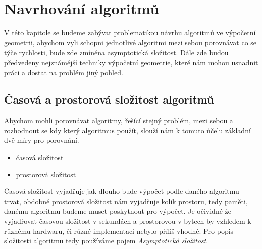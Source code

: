 \chapter{Navrhování algoritmů}
\label{chap:navrhovanialgoritmu}
	V této kapitole se budeme zabývat problematikou návrhu algoritmů ve výpočetní geometrii, abychom vyli schopni jednotlivé algoritmi mezi sebou porovnávat co se týče rychlosti, bude zde zmíněna asymptotická složitost. Dále zde budou předvedeny nejznámější techniky výpočetní geometrie, které nám mohou usnadnit práci a dostat na problém jiný pohled.

\section{Časová a prostorová složitost algoritmů}
	Abychom mohli porovnávat algoritmy, řešící stejný problém, mezi sebou a rozhodnout se kdy který algoritmus použít, slouží nám k tomuto účelu základní dvě míry pro porovnání.
\begin{itemize}
	\item časová složitost
	\item prostorová složitost
\end{itemize}
	Časová složitost vyjadřuje jak dlouho bude výpočet podle daného algoritmu trvat, obdobně prostorová složitost nám vyjadřuje kolik prostoru, tedy paměti, danému algoritmu budeme muset poskytnout pro výpočet. Je očividné že vyjadřovat časovou složitost v sekundách a prostorovou v bytech by vzhledem k různému hardwaru, či různé implementaci nebylo příliš vhodné. Pro popis složitosti algoritmu tedy používáme pojem \textit{Asymptotická složitost}.
	
